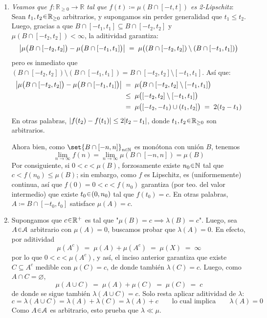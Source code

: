 \begin{sol}
\begin{enumerate}[label=(\roman*), leftmargin=1.8em]
\item %
\emph{Veamos que $f\colon \mathbb{R}_{\ge0} \to \mathbb{R}$ tal que $f(t) \coloneq \mu(B\cap[-t,t])$ es 2-Lipschitz}:\\
Sean $t_1,t_2\en\mathbb{R}_{\ge0}$ arbitrarios, y supongamos sin perder generalidad que $t_1 \leq t_2$. Luego, gracias a que $B \cap [-t_1,t_1] \subseteq B \cap [-t_2,t_2]$ y $\mu(B \cap [-t_2,t_2]) < \infty$, la aditividad garantiza:
\[
\abs{ 
    \mu\bigl( B \cap [-t_2,t_2] \bigr) - \mu\bigl( B \cap [-t_1,t_1] \bigr)
}
\;=\; \mu\bigl((B \cap [-t_2,t_2]) \setminus(B \cap [-t_1,t_1])\bigr)
\]
pero es inmediato que $(B \cap [-t_2,t_2]) \setminus(B \cap [-t_1,t_1]) = B \cap [-t_2,t_2]\setminus[-t_1,t_1]$. Así que:
\begin{align*}
\abs{ 
    \mu\bigl( B \cap [-t_2,t_2] \bigr) - \mu\bigl( B \cap [-t_1,t_1] \bigr)
}
&\;=\; \mu\bigl(B \cap [-t_2,t_2] \setminus [-t_1,t_1]\bigr)\\
&\;\leq\; \mu\bigl([-t_2,t_2] \setminus [-t_1,t_1]\bigr)\\
&\;=\; \mu\bigl([-t_2,-t_1) \cup (t_1,t_2]\bigr)\;=\; 2(t_2-t_1)
\end{align*}
En otras palabras, $\abs{f(t_2) - f(t_1)} \leq 2\abs{t_2-t_1}$, donde $t_1,t_2\en\mathbb{R}_{\ge0}$ son arbitrarios.\par
Ahora bien, como $\set{B\cap[-n,n]}_{n\en\mathbb{N}}$ es monótona con unión $B$, tenemos
\[
\lim_{n\to\infty}f(n) 
= \lim_{n\to\infty}\mu(B\cap[-n,n])
=\mu(B)
\]
Por consiguiente, si $0<c<\mu(B)$, forzosamente existe $n_0\en\mathbb{N}$ tal que $c < f(n_0) \le \mu(B)$; sin embargo, como
$f$ es Lipschitz, es (uniformemente) continua, así que $f(0) = 0 < c < f(n_0)$ garantiza (por teo. del valor intermedio) que existe $t_0\en(0,n_0)$ tal que $f(t_0) = c$. En otras palabras, $A \coloneq B \cap [-t_0,t_0]$ satisface $\mu(A) = c$.
\item %
Supongamos que $c\en\mathbb{R}^+$ es tal que "$\mu(B) = c \implies \lambda(B)=c$".
Luego, sea $A\en\mathcal{A}$ arbitrario con $\mu(A)=0$, buscamos probar que $\lambda(A) = 0$. En efecto, por aditividad 
\[
\mu(A^c) \;=\; \mu(A) + \mu(A^c) \;=\; \mu(X) \;=\; \infty
\] 
por lo que $0<c<\mu(A^c)$, y así, el inciso anterior garantiza que existe $C\subseteq A^c$ medible con $\mu(C) = c$, de donde también $\lambda(C) = c$. Luego, como $A \cap C = \varnothing$, 
\[
\mu(A\cup C) \;=\; \mu(A) + \mu(C) \;=\; \mu(C) \;=\; c
\]
de donde se sigue también $\lambda(A \cup C) = c$. Solo resta aplicar aditividad de $\lambda$:
\[
c 
= \lambda(A \cup C) = \lambda(A) + \lambda(C) = \lambda(A) + c
\qquad\text{lo cual implica}\qquad
\lambda(A) = 0
\]
Como $A\en\mathcal{A}$ es arbitrario, esto prueba que $\lambda \ll \mu$.
\end{enumerate}
\end{sol}